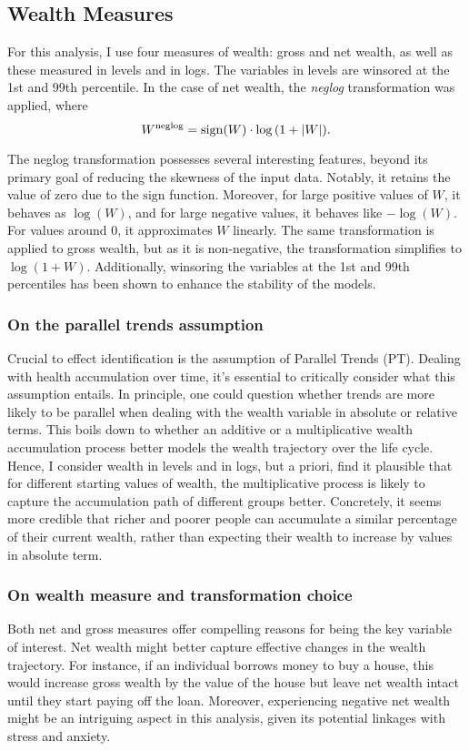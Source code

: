 \subsection{Wealth Measures}

For this analysis, I use four measures of wealth: gross and net wealth, as well as these measured in
levels and in logs. The variables in levels are winsored at the 1st and 99th percentile. In the case of 
net wealth, the \textit{neglog} transformation was applied, where%
%
\begin{equation}
    W^{\text{neglog}} = \operatorname{sign}(W) \cdot \log{ ( 1 + \lvert W \rvert ) }.
    \label{eq:neglog}
\end{equation}

The neglog transformation possesses several interesting features, beyond its primary goal of reducing the
skewness of the input data. Notably, it retains the value of zero due to the $\text{sign}$ function. Moreover,
for large positive values of $W$, it behaves as $\log(W)$, and for large negative values, it behaves like
$-\log(W)$. For values around 0, it approximates $W$ linearly. The same transformation is applied to gross
wealth, but as it is non-negative, the transformation simplifies to $\log{(1+W)}$. Additionally, winsoring the
variables at the 1st and 99th percentiles has been shown to enhance the stability of the models.

\subsubsection{On the parallel trends assumption} Crucial to effect identification is the assumption of
Parallel Trends (PT). Dealing with health accumulation over time, it's essential to critically consider what
this assumption entails. In principle, one could question whether trends are more likely to be parallel when
dealing with the wealth variable in absolute or relative terms. This boils down to whether an additive or a
multiplicative wealth accumulation process better models the wealth trajectory over the life cycle. Hence, I
consider wealth in levels and in logs, but a priori, find it  plausible that for different starting values of
wealth, the multiplicative process is likely to capture the accumulation path of different groups better.
Concretely, it seems more credible that richer and poorer people can accumulate a similar percentage of their
current wealth, rather than expecting their wealth to increase by values in absolute term.


\subsubsection{On wealth measure and transformation choice} Both net and gross measures offer compelling
reasons for being the key variable of interest. Net wealth might better capture effective changes in the wealth
trajectory. For instance, if an individual borrows money to buy a house, this would increase gross wealth by
the value of the house but leave net wealth intact until they start paying off the loan. Moreover, experiencing
negative net wealth might be an intriguing aspect in this analysis, given its potential linkages with stress
and anxiety.

